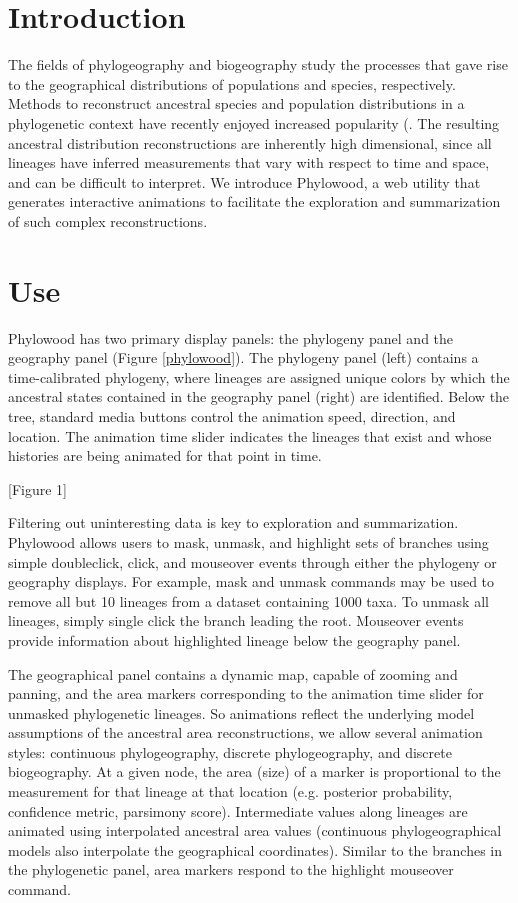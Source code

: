 \documentclass[11pt]{article}
\begin{document}
\section{Introduction}

The fields of phylogeography and biogeography study the processes that gave rise to the geographical distributions of populations and species, respectively. Methods to reconstruct ancestral species and population distributions in a phylogenetic context have recently enjoyed increased popularity (\citep{ronquist97, ree08, lemmon08, lemey09, yu10, landis12}. The resulting ancestral distribution reconstructions are inherently high dimensional, since all lineages have inferred measurements that vary with respect to time and space, and can be difficult to interpret. We introduce Phylowood, a web utility that generates interactive animations to facilitate the exploration and summarization of such complex reconstructions.

\section{Use}

Phylowood has two primary display panels: the phylogeny panel and the geography panel (Figure \ref{phylowood}). The phylogeny panel (left) contains a time-calibrated phylogeny, where lineages are assigned unique colors by which the ancestral states contained in the geography panel (right) are identified. Below the tree, standard media buttons control the animation speed, direction, and location. The animation time slider indicates the lineages that exist and whose histories are being animated for that point in time.

[Figure 1]

Filtering out uninteresting data is key to exploration and summarization. Phylowood allows users to mask, unmask, and highlight sets of branches using simple doubleclick, click, and mouseover events through either the phylogeny or geography displays. For example, mask and unmask commands may be used to remove all but 10 lineages from a dataset containing 1000 taxa. To unmask all lineages, simply single click the branch leading the root. Mouseover events provide information about highlighted lineage below the geography panel.


The geographical panel contains a dynamic map, capable of zooming and panning, and the area markers corresponding to the animation time slider for unmasked phylogenetic lineages. So animations reflect the underlying model assumptions of the ancestral area reconstructions, we allow several animation styles: continuous phylogeography, discrete phylogeography, and discrete biogeography. At a given node, the area (size) of a marker is proportional to the measurement for that lineage at that location (e.g. posterior probability, confidence metric, parsimony score). Intermediate values along lineages are animated using interpolated ancestral area values (continuous phylogeographical models also interpolate the geographical coordinates). Similar to the branches in the phylogenetic panel, area markers respond to the highlight mouseover command.
\end{document}
